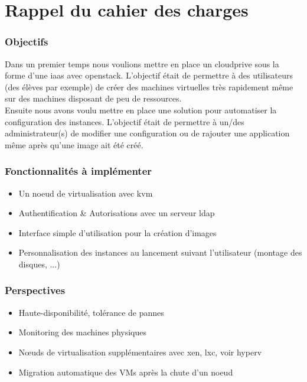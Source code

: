 \documentclass[a4paper,oneside]{report}
\begin{document}
\section{Rappel du cahier des charges}
\subsubsection{Objectifs}
Dans un premier temps nous voulions mettre en place un \gls{cloudprive} sous la forme d'une \gls{iaas} avec \gls{openstack}.
L'objectif était de permettre à des utilisateurs (des élèves par exemple) de créer des machines virtuelles très rapidement même sur des machines disposant de peu de ressources.\\

Ensuite nous avons voulu mettre en place une solution pour automatiser la configuration des instances.
L'objectif était de permettre à un/des administrateur(s) de modifier une configuration ou de rajouter une application même après qu'une image ait été créé.

\subsubsection{Fonctionnalités à implémenter}
\begin{itemize}
\item Un noeud de \gls{virtualisation} avec \gls{kvm}
\item Authentification \& Autorisations avec un serveur \gls{ldap}
\item Interface simple d'utilisation pour la création d'images
\item Personnalisation des instances au lancement suivant l'utilisateur (montage des disques, ...)
\end{itemize}

\subsubsection{Perspectives}
\begin{itemize}
\item Haute-disponibilité, tolérance de pannes
\item Monitoring des machines physiques
\item Nœuds de \gls{virtualisation} supplémentaires avec \gls{xen}, \gls{lxc}, voir \gls{hyperv}
\item Migration automatique des VMs après la chute d'un noeud
\end{itemize}
\end{document}
